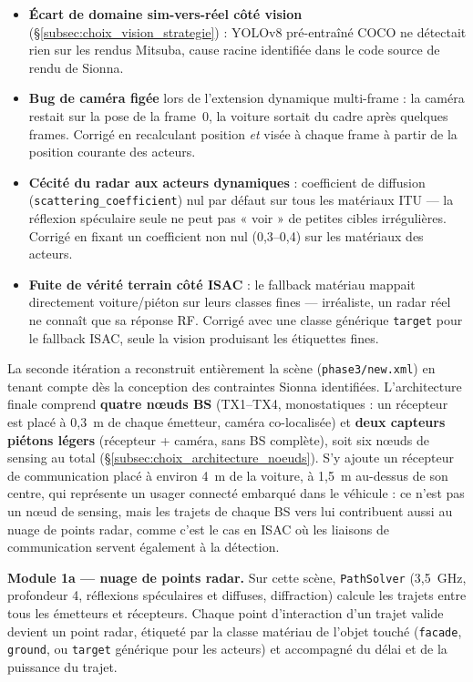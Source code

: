 \documentclass[12pt,a4paper,titlepage]{article}
\begin{document}
\begin{itemize}[leftmargin=1.5em]
    \item \textbf{Écart de domaine sim-vers-réel côté vision} (\S\ref{subsec:choix_vision_strategie}) : YOLOv8 pré-entraîné COCO ne détectait rien sur les rendus Mitsuba, cause racine identifiée dans le code source de rendu de Sionna.
    \item \textbf{Bug de caméra figée} lors de l'extension dynamique multi-frame : la caméra restait sur la pose de la frame~0, la voiture sortait du cadre après quelques frames. Corrigé en recalculant position \emph{et} visée à chaque frame à partir de la position courante des acteurs.
    \item \textbf{Cécité du radar aux acteurs dynamiques} : coefficient de diffusion (\texttt{scat\-ter\-ing\_co\-ef\-fi\-cient}) nul par défaut sur tous les matériaux ITU --- la réflexion spéculaire seule ne peut pas « voir » de petites cibles irrégulières. Corrigé en fixant un coefficient non nul (0,3--0,4) sur les matériaux des acteurs.
    \item \textbf{Fuite de vérité terrain côté ISAC} : le fallback matériau mappait directement voiture/piéton sur leurs classes fines --- irréaliste, un radar réel ne connaît que sa réponse RF. Corrigé avec une classe générique \texttt{target} pour le fallback ISAC, seule la vision produisant les étiquettes fines.
\end{itemize}

La seconde itération a reconstruit entièrement la scène (\texttt{phase3/new.xml}) en tenant compte dès la conception des contraintes Sionna identifiées. L'architecture finale comprend \textbf{quatre n\oe uds BS} (TX1--TX4, monostatiques : un récepteur est placé à 0,3~m de chaque émetteur, caméra co-localisée) et \textbf{deux capteurs piétons légers} (récepteur + caméra, sans BS complète), soit six n\oe uds de sensing au total (\S\ref{subsec:choix_architecture_noeuds}). S'y ajoute un récepteur de communication placé à environ 4~m de la voiture, à 1,5~m au-dessus de son centre, qui représente un usager connecté embarqué dans le véhicule : ce n'est pas un n\oe ud de sensing, mais les trajets de chaque BS vers lui contribuent aussi au nuage de points radar, comme c'est le cas en ISAC où les liaisons de communication servent également à la détection.

\textbf{Module 1a --- nuage de points radar.} Sur cette scène, \texttt{PathSolver} (3,5~GHz, profondeur 4, réflexions spéculaires et diffuses, diffraction) calcule les trajets entre tous les émetteurs et récepteurs. Chaque point d'interaction d'un trajet valide devient un point radar, étiqueté par la classe matériau de l'objet touché (\texttt{facade}, \texttt{ground}, ou \texttt{target} générique pour les acteurs) et accompagné du délai et de la puissance du trajet.
\end{document}
